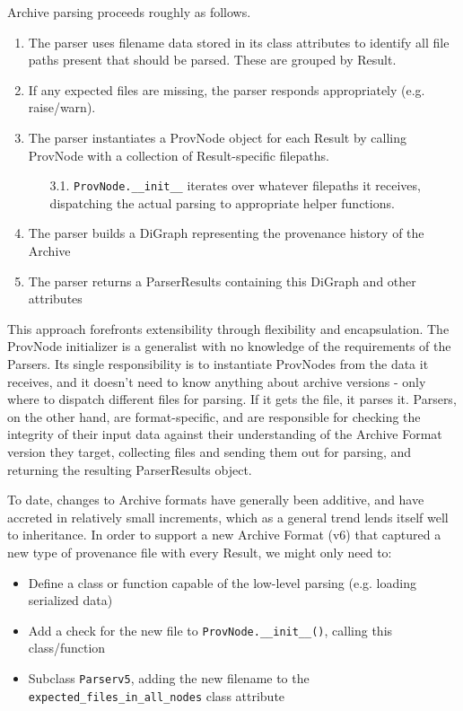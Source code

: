 Archive parsing proceeds roughly as follows.
\begin{enumerate}
    \item The parser uses filename data stored in its class attributes to identify all file paths present that should be parsed. These are grouped by Result.
    \item If any expected files are missing, the parser responds appropriately (e.g. raise/warn).
    \item The parser instantiates a ProvNode object for each Result by calling ProvNode with a collection of Result-specific filepaths.
    \begin{enumerate}
        \item[3.1.]\texttt{ProvNode.\_\_init\_\_} iterates over whatever filepaths it receives, dispatching the actual parsing to appropriate helper functions. 
    \end{enumerate}
    \item The parser builds a DiGraph representing the provenance history of the Archive
    \item The parser returns a ParserResults containing this DiGraph and other attributes
\end{enumerate}

This approach forefronts extensibility through flexibility and encapsulation.
The ProvNode initializer is a generalist with no knowledge of the requirements
of the Parsers. Its single responsibility is to instantiate ProvNodes from the
data it receives, and it doesn’t need to know anything about archive versions -
only where to dispatch different files for parsing. If it gets the file, it
parses it. Parsers, on the other hand, are format-specific, and are responsible
for checking the integrity of their input data against their understanding of
the Archive Format version they target, collecting files and sending them out
for parsing, and returning the resulting ParserResults object.

To date, changes to Archive formats have generally been additive, and have
accreted in relatively small increments, which as a general trend lends itself
well to inheritance. In order to support a new Archive Format (v6) that captured
a new type of provenance file with every Result, we might only need to:
\begin{itemize}
    \item Define a class or function capable of the low-level parsing (e.g. loading serialized data)
    \item Add a check for the new file to \texttt{ProvNode.\_\_init\_\_()}, calling this class/function
    \item Subclass \texttt{Parserv5}, adding the new filename to the \texttt{expected\_files\_in\_all\_nodes} class attribute
\end{itemize}


